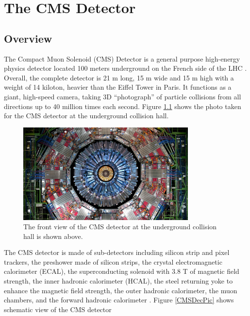 \chapter{The CMS Detector}

\section{Overview}

The Compact Muon Solenoid (CMS) Detector is a general purpose high-energy physics detector located 100 meters underground on the French side of the LHC \cite{CMSDetector}. Overall, the complete detector is 21 m long, 15 m wide and 15 m high with a weight of 14 kiloton, heavier than the Eiffel Tower in Paris. It functions as a giant, high-speed camera, taking 3D ``photograph'' of particle collisions from all directions up to 40 million times each second. Figure \ref{CMSRealPic} shows the photo taken for the CMS detector at the underground collision hall.

\begin{figure}[hbtp]
\begin{center}
\includegraphics[width=0.80\textwidth]{Figures/Chapter3/CMSRealPic.jpg}
\caption{The front view of the CMS detector at the underground collision hall is shown above.}
\label{CMSRealPic}
\end{center}
\end{figure} 

The CMS detector is made of sub-detectors including silicon strip and pixel trackers, the preshower made of silicon strips, the crystal electromagnetic calorimeter (ECAL), the superconducting solenoid with 3.8 T of magnetic field strength, the inner hadronic calorimeter (HCAL), the steel returning yoke to enhance the magnetic field strength, the outer hadronic calorimeter, the muon chambers, and the forward hadronic calorimeter \cite{CMSDetector}. Figure \ref{CMSDecPic} shows schematic view of the CMS detector

